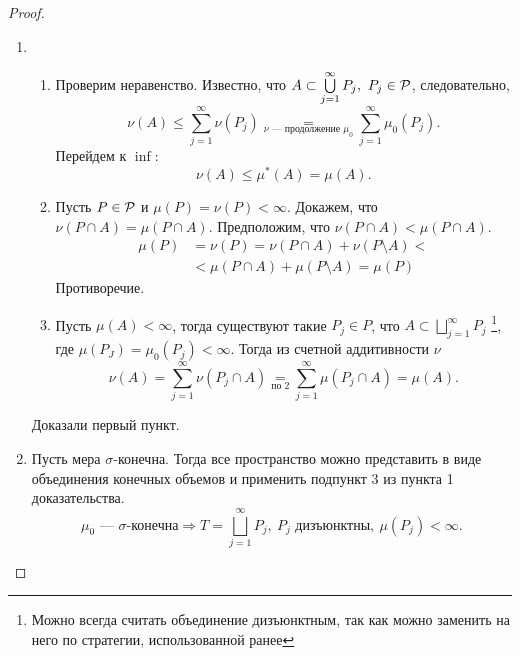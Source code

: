 \begin{proof}
	$ $
	\begin{enumerate}
	    \item 
	\begin{enumerate}[label=\boxed{\arabic*}]
	    \item Проверим неравенство. Известно, что $ A \subset \bigcup\limits_{j=1}^{\infty} P_j, ~ P_j \in \P$, следовательно, \[
				\nu (A) \le \sum_{j=1}^{\infty} \nu (P_j) \underset{\nu \text{ --- продолжение } \mu_0 }{=} \sum_{j=1}^{\infty} \mu_0(P_j)
	    .\] 
		Перейдем к $ \inf$:
		\[
			\nu (A) \le  \mu^*( A ) = \mu(A)
		.\] 
	\item Пусть $ P \in \P$ и $ \mu(P) = \nu (P) < \infty$. Докажем, что $ \nu (P \cap A) = \mu(P \cap A)$. Предположим, что $ \nu (P \cap A) < \mu(P \cap A)$.
		\[
		\begin{aligned}
			\mu(P) &= \nu (P) = \nu (P \cap A) + \nu (P \setminus A) < \\&< \mu(P \cap A) + \mu(P \setminus A) = \mu(P)
		\end{aligned}
		\]
		Противоречие.
	\item Пусть $ \mu(A)<\infty$, тогда существуют такие $ P_j \in P$, что $ A \subset \bigsqcup\limits_{j=1}^{\infty} P_j$ \footnote{Можно всегда считать объединение дизъюнктным, так как можно заменить на него по стратегии, использованной ранее}, где $ \mu(P_J) = \mu_0(P_j) < \infty$.
		Тогда из счетной аддитивности $ \nu $
		\[
			\nu (A) =  \sum_{j=1}^{\infty} \nu (P_j \cap A) \underset{\text{по 2}}{=} \sum_{j=1}^{\infty} \mu(P_j \cap A) = \mu(A)
		.\] 
	\end{enumerate} 
		Доказали первый пункт.
\item Пусть мера $ \sigma $-конечна. Тогда все пространство можно представить в виде объединения конечных объемов и применить подпункт 3 из пункта 1 доказательства.
	\[
		\mu_0 \text{ --- }  \sigma \text{-конечна} \Longrightarrow T = \bigsqcup_{j=1}^{\infty} P_j, ~P_j \text{ дизъюнктны},  ~ \mu(P_j) < \infty
	.\] 
	\end{enumerate} 
\end{proof}


